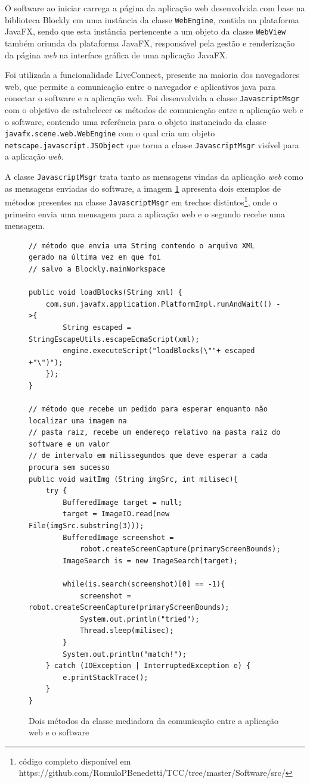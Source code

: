 \documentclass[tg]{mdtufsm}
\begin{document}
                    O software ao iniciar carrega a página da aplicação web desenvolvida com base na biblioteca Blockly em uma instância da classe \texttt{WebEngine}, contida na plataforma JavaFX, sendo que esta instância pertencente a um objeto da classe \texttt{WebView} também oriunda da plataforma JavaFX, responsável pela gestão e renderização da página \emph{web} na interface gráfica de uma aplicação JavaFX.

                    Foi utilizada a funcionalidade LiveConnect, presente na maioria dos navegadores web, que permite a comunicação entre o navegador e aplicativos java para conectar o software e a aplicação web. Foi desenvolvida a classe \texttt{JavascriptMsgr} com o objetivo de estabelecer os métodos de comunicação entre a aplicação web e o software, contendo uma referência para o objeto instanciado da classe \texttt{javafx.scene.web.WebEngine} com o qual cria um objeto \texttt{netscape.javascript.JSObject} que torna a classe \texttt{JavascriptMsgr} visível para a aplicação \emph{web}.

                    A classe \texttt{JavascriptMsgr} trata tanto as mensagens vindas da aplicação \emph{web} como as mensagens enviadas do software, a imagem \ref{code:javascriptmsg.java} apresenta dois exemplos de métodos presentes na classe \texttt{JavascriptMsgr} em trechos distintos\footnote{código completo disponível em https://github.com/RomuloPBenedetti/TCC/tree/master/Software/src/}, onde o primeiro envia uma mensagem para a aplicação web e o segundo recebe uma mensagem.


\begin{figure}[!htb]
\begin{lstlisting}
// método que envia uma String contendo o arquivo XML gerado na última vez em que foi
// salvo a Blockly.mainWorkspace

public void loadBlocks(String xml) {
    com.sun.javafx.application.PlatformImpl.runAndWait(() ->{
        String escaped = StringEscapeUtils.escapeEcmaScript(xml);
        engine.executeScript("loadBlocks(\""+ escaped +"\")");
    });
}

// método que recebe um pedido para esperar enquanto não localizar uma imagem na
// pasta raiz, recebe um endereço relativo na pasta raiz do software e um valor
// de intervalo em milissegundos que deve esperar a cada procura sem sucesso
public void waitImg (String imgSrc, int milisec){
    try {
        BufferedImage target = null;
        target = ImageIO.read(new File(imgSrc.substring(3)));
        BufferedImage screenshot =
            robot.createScreenCapture(primaryScreenBounds);
        ImageSearch is = new ImageSearch(target);

        while(is.search(screenshot)[0] == -1){
            screenshot = robot.createScreenCapture(primaryScreenBounds);
            System.out.println("tried");
            Thread.sleep(milisec);
        }
        System.out.println("match!");
    } catch (IOException | InterruptedException e) {
        e.printStackTrace();
    }
}
\end{lstlisting}
    \caption{Dois métodos da classe mediadora da comunicação entre a aplicação web e o software}
	\label{code:javascriptmsg.java}
\end{figure}
\end{document}

